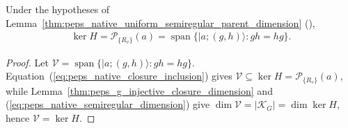 \begin{lemma}%
    \label{thm:peps_native_uniform_semiregular_parent_spanning}
    \leanok
    Under the hypotheses of
    Lemma~\ref{thm:peps_native_uniform_semiregular_parent_dimension}
    (\cite[Theorems~5.7 and~5.9]{Schuch2010PEPS}),
    \begin{align}
        \ker H=\mathcal P_{\{R_v\}}(a)
        =\operatorname{span}\{\lvert a;(g,h)\rangle:gh=hg\}.
        \label{eq:peps_native_semiregular_spanning}
    \end{align}
\end{lemma}
\begin{proof}\leanok
    Let $\mathcal V=\operatorname{span}\{\lvert a;(g,h)\rangle:gh=hg\}$.
    Equation~(\ref{eq:peps_native_closure_inclusion}) gives
    $\mathcal V\subseteq\ker H=\mathcal P_{\{R_v\}}(a)$, while
    Lemma~\ref{thm:peps_g_injective_closure_dimension} and
    (\ref{eq:peps_native_semiregular_dimension}) give
    $\dim\mathcal V=|\mathcal K_G|=\dim\ker H$, hence $\mathcal V=\ker H$.
\end{proof}
